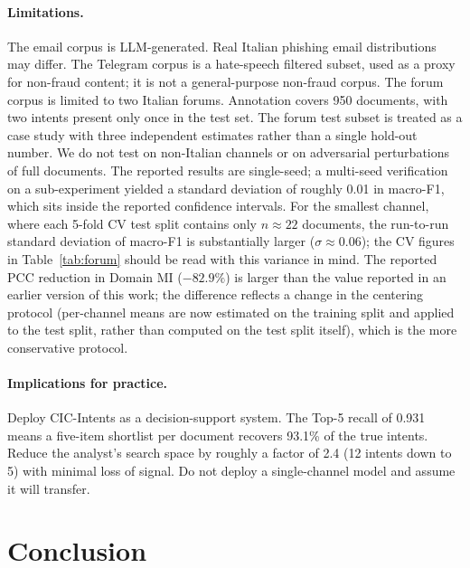 \documentclass[preprint,12pt,authoryear]{elsarticle}
\begin{document}
\paragraph*{Limitations.} The email corpus is LLM-generated. Real
Italian phishing email distributions may differ. The Telegram corpus
is a hate-speech filtered subset, used as a proxy for non-fraud
content; it is not a general-purpose non-fraud corpus. The forum
corpus is limited to two Italian forums. Annotation covers 950
documents, with two intents present only once in the test set. The
forum test subset is treated as a case study with three independent
estimates rather than a single hold-out number. We do not test on
non-Italian channels or on adversarial perturbations of full
documents. The reported results are single-seed; a multi-seed
verification on a sub-experiment yielded a standard deviation of
roughly 0.01 in macro-F1, which sits inside the reported confidence
intervals. For the smallest channel, where each 5-fold CV test split
contains only $n \approx 22$ documents, the run-to-run standard
deviation of macro-F1 is substantially larger ($\sigma \approx
0.06$); the CV figures in Table~\ref{tab:forum} should be read with
this variance in mind. The reported PCC reduction in Domain MI
($-82.9\%$) is larger than the value reported in an earlier version
of this work; the difference reflects a change in the centering
protocol (per-channel means are now estimated on the training split
and applied to the test split, rather than computed on the test
split itself), which is the more conservative protocol.

\paragraph*{Implications for practice.} Deploy CIC-Intents as a
decision-support system. The Top-5 recall of 0.931 means a five-item
shortlist per document recovers 93.1\% of the true intents. Reduce
the analyst's search space by roughly a factor of 2.4 (12 intents
down to 5) with minimal loss of signal. Do not deploy a
single-channel model and assume it will transfer.

\section{Conclusion}
\label{sec:conclusion}
\end{document}
